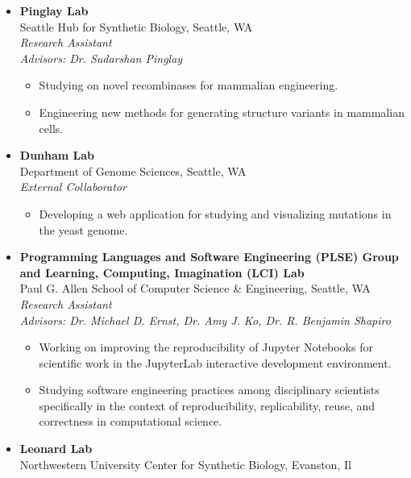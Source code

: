 \documentclass{article}
\begin{document}
\begin{itemize}[leftmargin=1.5in]
    \item[Jun 2025–Present] \textbf{Pinglay Lab}\\
    Seattle Hub for Synthetic Biology, Seattle, WA\\
    \textit{Research Assistant}\\
    \textit{Advisors: Dr. Sudarshan Pinglay}
    \begin{itemize}
        \item Studying on novel recombinases for mammalian engineering.
        \item Engineering new methods for generating structure variants in mammalian cells.
    \end{itemize}
    \item[Feb 2025–Present] \textbf{Dunham Lab}\\
    Department of Genome Sciences, Seattle, WA\\
    \textit{External Collaborator}
    \begin{itemize}
        \item Developing a web application for studying and visualizing mutations in the yeast genome.
    \end{itemize}
    \item[Sep 2024–Aug 2025] \textbf{Programming Languages and Software Engineering (PLSE) Group\\and Learning, Computing, Imagination (LCI) Lab}\\
    Paul G. Allen School of Computer Science \& Engineering, Seattle, WA\\
    \textit{Research Assistant}\\
    \textit{Advisors: Dr. Michael D. Ernst, Dr. Amy J. Ko, Dr. R. Benjamin Shapiro}
    \begin{itemize}
        \item Working on improving the reproducibility of Jupyter Notebooks for scientific work in the JupyterLab interactive development environment.
        \item Studying software engineering practices among disciplinary scientists specifically in the context of reproducibility, replicability, reuse, and correctness in computational science.
    \end{itemize}
    \item[Dec 2021–Jun 2024] \textbf{Leonard Lab}\\
    Northwestern University Center for Synthetic Biology, Evanston, Il\\

\end{itemize}
\end{document}
